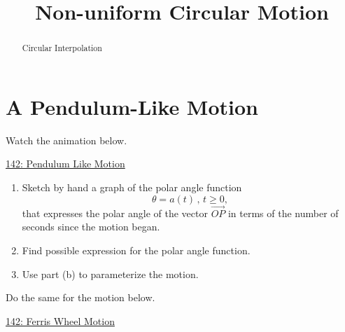 \documentclass{ximera}
\title{Non-uniform Circular Motion}
\begin{document}
\begin{abstract}
Circular Interpolation
\end{abstract}
\maketitle


\section{A Pendulum-Like Motion}

\begin{question} \label{Q9Adfdsf}

Watch the animation below.

\begin{onlineOnly}
    \begin{center}
\end{center}
\end{onlineOnly}

\href{https://www.desmos.com/calculator/krsuq877va}{142: Pendulum Like Motion}

\begin{enumerate}
\item Sketch by hand a graph of the polar angle function 
\[
      \theta=a(t) \, , \, t\geq 0,
\]
that expresses the polar angle of the vector $\overrightarrow{OP}$ in terms of the number of seconds since the motion began.

\item Find possible expression for the polar angle function.

\item Use part (b) to parameterize the motion.
\end{enumerate}

\end{question}


\begin{question} \label{PFRDF}
Do the same for the motion below.

\begin{onlineOnly}
    \begin{center}
\end{center}
\end{onlineOnly}

\href{https://www.desmos.com/calculator/kdbl8xlwrw}{142: Ferris Wheel Motion}

\end{question}
\end{document}
